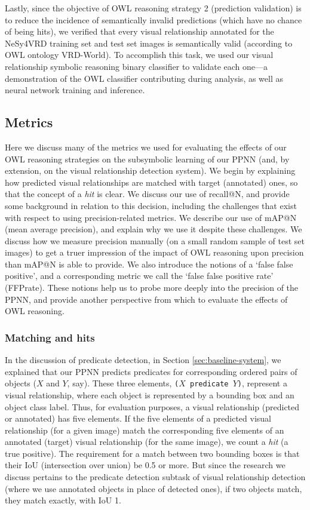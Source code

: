 \documentclass[]{jair}
\begin{document}
Lastly, since the objective of OWL reasoning strategy 2 (prediction validation) is to reduce the incidence of semantically invalid predictions (which have no chance of being hits), we verified that every visual relationship annotated for the NeSy4VRD training set and test set images is semantically valid (according to OWL ontology VRD-World).
To accomplish this task, we used our visual relationship symbolic reasoning binary classifier to validate each one---a demonstration of the OWL classifier contributing during analysis, as well as neural network training and inference.




\subsection{Metrics}
\label{sec:metrics}

Here we discuss many of the metrics we used for evaluating the effects of our OWL reasoning strategies on the subsymbolic learning of our PPNN (and, by extension, on the visual relationship detection system).
We begin by explaining how predicted visual relationships are matched with target (annotated) ones, so that the concept of a \emph{hit} is clear.
We discuss our use of recall@N, and provide some background in relation to this decision, including the challenges that exist with respect to using precision-related metrics.
We describe our use of mAP@N (mean average precision), and explain why we use it despite these challenges. 
We discuss how we measure precision manually (on a small random sample of test set images) to get a truer impression of the impact of OWL reasoning upon precision than mAP@N is able to provide.
We also introduce the notions of a `false false positive', and a corresponding metric we call the  `false false positive rate' (FFPrate).
These notions help us to probe more deeply into the precision of the PPNN, and provide another perspective from which to evaluate the effects of OWL reasoning.

\subsubsection{Matching and hits}
In the discussion of predicate detection, in Section \ref{sec:baseline-system}, we explained that our PPNN predicts predicates for corresponding ordered pairs of objects ($X$ and $Y$, say).
These three elements, \texttt{($X$ predicate $Y$)}, represent a visual relationship, where each object is represented by a bounding box and an object class label.
Thus, for evaluation purposes, a visual relationship (predicted or annotated) has five elements.
If the five elements of a predicted visual relationship (for a given image) match the corresponding five elements of an annotated (target) visual relationship (for the same image), we count a \emph{hit} (a true positive).
The requirement for a match between two bounding boxes is that their IoU (intersection over union) be 0.5 or more.
But since the research we discuss pertains to the predicate detection subtask of visual relationship detection (where we use annotated objects in place of detected ones), if two objects match, they match exactly, with IoU 1.
\end{document}
